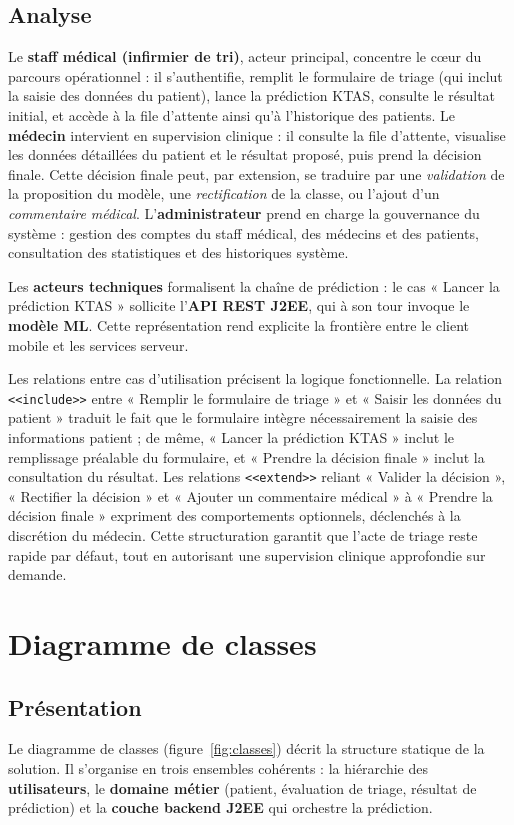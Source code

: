 \subsection{Analyse}
Le \textbf{staff médical (infirmier de tri)}, acteur principal, concentre le cœur du parcours
opérationnel : il s'authentifie, remplit le formulaire de triage (qui inclut la saisie des
données du patient), lance la prédiction KTAS, consulte le résultat initial, et accède à la
file d'attente ainsi qu'à l'historique des patients. Le \textbf{médecin} intervient en
supervision clinique : il consulte la file d'attente, visualise les données détaillées du
patient et le résultat proposé, puis prend la décision finale. Cette décision finale peut, par
extension, se traduire par une \textit{validation} de la proposition du modèle, une
\textit{rectification} de la classe, ou l'ajout d'un \textit{commentaire médical}.
L'\textbf{administrateur} prend en charge la gouvernance du système : gestion des comptes du
staff médical, des médecins et des patients, consultation des statistiques et des historiques
système.

Les \textbf{acteurs techniques} formalisent la chaîne de prédiction : le cas « Lancer la
prédiction KTAS » sollicite l'\textbf{API REST J2EE}, qui à son tour invoque le \textbf{modèle
ML}. Cette représentation rend explicite la frontière entre le client mobile et les services
serveur.

Les relations entre cas d'utilisation précisent la logique fonctionnelle. La relation
\texttt{<<include>>} entre « Remplir le formulaire de triage » et « Saisir les données du
patient » traduit le fait que le formulaire intègre nécessairement la saisie des informations
patient ; de même, « Lancer la prédiction KTAS » inclut le remplissage préalable du formulaire,
et « Prendre la décision finale » inclut la consultation du résultat. Les relations
\texttt{<<extend>>} reliant « Valider la décision », « Rectifier la décision » et « Ajouter un
commentaire médical » à « Prendre la décision finale » expriment des comportements optionnels,
déclenchés à la discrétion du médecin. Cette structuration garantit que l'acte de triage reste
rapide par défaut, tout en autorisant une supervision clinique approfondie sur demande.

\section{Diagramme de classes}

\subsection{Présentation}
Le diagramme de classes (figure~\ref{fig:classes}) décrit la structure statique de la solution.
Il s'organise en trois ensembles cohérents : la hiérarchie des \textbf{utilisateurs}, le
\textbf{domaine métier} (patient, évaluation de triage, résultat de prédiction) et la
\textbf{couche backend J2EE} qui orchestre la prédiction.

